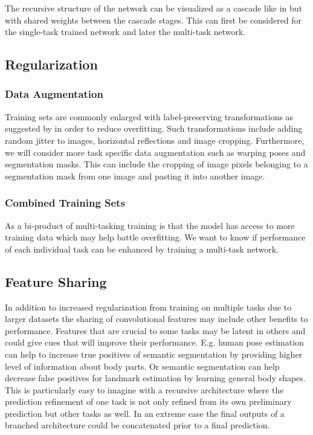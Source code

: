 \documentclass[a4paper,10pt]{article}
\begin{document}
The recursive structure of the network can be visualized as a cascade like in \cite{Tompson2015,Wei2016} but with shared weights between the cascade stages.  This can first be considered for the single-task trained network and later the multi-task network.


\subsection{Regularization}
\label{sec:reg}
\subsubsection{Data Augmentation}
\label{sec:reg:augmentation}
Training sets are commonly enlarged with label-preserving transformations as suggested by \cite{Krizhevsky2012} in order to reduce overfitting. Such transformations include adding random jitter to images, horizontal reflections and image cropping.  Furthermore, we will consider more task specific data augmentation such as warping poses and segmentation masks.  This can include the cropping of image pixels belonging to a segmentation mask from one image and pasting it into another image.

\subsubsection{Combined Training Sets}
\label{sec:reg:combined}
As a bi-product of multi-tasking training is that the model has access to more training data which may help battle overfitting.  We want to know if performance of each individual task can be enhanced by training a multi-task network.  

\subsection{Feature Sharing}
In addition to increased regularization from training on multiple tasks due to larger datasets the sharing of convolutional features may include other benefits to performance.  Features that are crucial to some tasks may be latent in others and could give cues that will improve their performance. E.g. human pose estimation can help to increase true positives of semantic segmentation by providing higher level of information about body parts.  Or semantic segmentation can help decrease false positives for landmark estimation by learning general body shapes.  This is particularly easy to imagine with a recursive architecture where the prediction refinement of one task is not only refined from its own preliminary prediction but other tasks as well.  In an extreme case the final outputs of a branched architecture could be concatenated prior to a final prediction.
\end{document}
